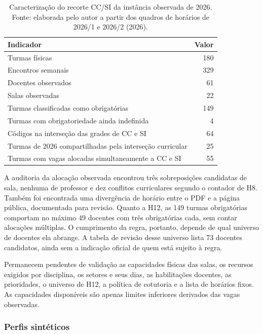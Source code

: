 \begin{table}[htbp]
  \centering
  \caption{Caracterização do recorte CC/SI da instância observada de 2026. Fonte: elaborada pelo autor a partir dos quadros de horários de 2026/1 e 2026/2 (2026).}
  \label{tab:instancia}
  \small
  \begin{tabular}{lr}
    \toprule
    \textbf{Indicador} & \textbf{Valor} \\
    \midrule
    Turmas físicas & 180 \\
    Encontros semanais & 329 \\
    Docentes observados & 61 \\
    Salas observadas & 22 \\
    Turmas classificadas como obrigatórias & 149 \\
    Turmas com obrigatoriedade ainda indefinida & 4 \\
    Códigos na interseção das grades de CC e SI & 64 \\
    Turmas de 2026 compartilhadas pela interseção curricular & 25 \\
    Turmas com vagas alocadas simultaneamente a CC e SI & 55 \\
    \bottomrule
  \end{tabular}
\end{table}

A auditoria da alocação observada encontrou três sobreposições candidatas de sala, nenhuma de professor e dez conflitos curriculares segundo o contador de H8. Também foi encontrada uma divergência de horário entre o PDF e a página pública, documentada para revisão. Quanto a H12, as 149 turmas obrigatórias comportam no máximo 49 docentes com três obrigatórias cada, sem contar alocações múltiplas. O cumprimento da regra, portanto, depende de qual universo de docentes ela abrange. A tabela de revisão desse universo lista 73 docentes candidatos, ainda sem a indicação oficial de quem está sujeito à regra.

Permanecem pendentes de validação as capacidades físicas das salas, os recursos exigidos por disciplina, os setores e seus dias, as habilitações docentes, as prioridades, o universo de H12, a política de cotutoria e a lista de horários fixos. As capacidades disponíveis são apenas limites inferiores derivados das vagas observadas. 

\subsubsection{Perfis sintéticos}
\label{subsubsec:perfis}

